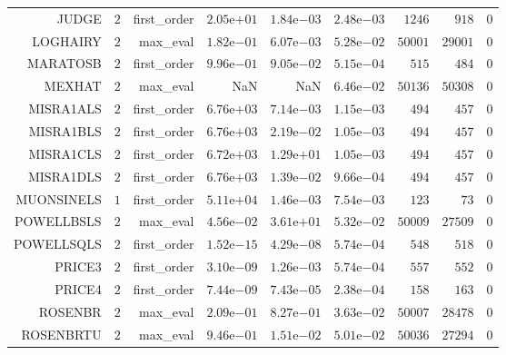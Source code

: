 \begin{longtable}{rrrrrrrrr}
JUDGE & \(     2\) & first\_order & \( 2.05\)e\(+01\) & \( 1.84\)e\(-03\) & \( 2.48\)e\(-03\) & \(  1246\) & \(   918\) & \(     0\) \\
LOGHAIRY & \(     2\) & max\_eval & \( 1.82\)e\(-01\) & \( 6.07\)e\(-03\) & \( 5.28\)e\(-02\) & \( 50001\) & \( 29001\) & \(     0\) \\
MARATOSB & \(     2\) & first\_order & \( 9.96\)e\(-01\) & \( 9.05\)e\(-02\) & \( 5.15\)e\(-04\) & \(   515\) & \(   484\) & \(     0\) \\
MEXHAT & \(     2\) & max\_eval &       NaN &       NaN & \( 6.46\)e\(-02\) & \( 50136\) & \( 50308\) & \(     0\) \\
MISRA1ALS & \(     2\) & first\_order & \( 6.76\)e\(+03\) & \( 7.14\)e\(-03\) & \( 1.15\)e\(-03\) & \(   494\) & \(   457\) & \(     0\) \\
MISRA1BLS & \(     2\) & first\_order & \( 6.76\)e\(+03\) & \( 2.19\)e\(-02\) & \( 1.05\)e\(-03\) & \(   494\) & \(   457\) & \(     0\) \\
MISRA1CLS & \(     2\) & first\_order & \( 6.72\)e\(+03\) & \( 1.29\)e\(+01\) & \( 1.05\)e\(-03\) & \(   494\) & \(   457\) & \(     0\) \\
MISRA1DLS & \(     2\) & first\_order & \( 6.76\)e\(+03\) & \( 1.39\)e\(-02\) & \( 9.66\)e\(-04\) & \(   494\) & \(   457\) & \(     0\) \\
MUONSINELS & \(     1\) & first\_order & \( 5.11\)e\(+04\) & \( 1.46\)e\(-03\) & \( 7.54\)e\(-03\) & \(   123\) & \(    73\) & \(     0\) \\
POWELLBSLS & \(     2\) & max\_eval & \( 4.56\)e\(-02\) & \( 3.61\)e\(+01\) & \( 5.32\)e\(-02\) & \( 50009\) & \( 27509\) & \(     0\) \\
POWELLSQLS & \(     2\) & first\_order & \( 1.52\)e\(-15\) & \( 4.29\)e\(-08\) & \( 5.74\)e\(-04\) & \(   548\) & \(   518\) & \(     0\) \\
PRICE3 & \(     2\) & first\_order & \( 3.10\)e\(-09\) & \( 1.26\)e\(-03\) & \( 5.74\)e\(-04\) & \(   557\) & \(   552\) & \(     0\) \\
PRICE4 & \(     2\) & first\_order & \( 7.44\)e\(-09\) & \( 7.43\)e\(-05\) & \( 2.38\)e\(-04\) & \(   158\) & \(   163\) & \(     0\) \\
ROSENBR & \(     2\) & max\_eval & \( 2.09\)e\(-01\) & \( 8.27\)e\(-01\) & \( 3.63\)e\(-02\) & \( 50007\) & \( 28478\) & \(     0\) \\
ROSENBRTU & \(     2\) & max\_eval & \( 9.46\)e\(-01\) & \( 1.51\)e\(-02\) & \( 5.01\)e\(-02\) & \( 50036\) & \( 27294\) & \(     0\) \\

\end{longtable}
